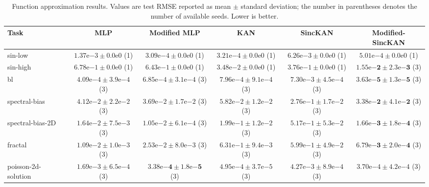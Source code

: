 \documentclass[preprint,12pt]{elsarticle}
\begin{document}
\begin{table}[t]
\centering
\caption{Function approximation results. Values are test RMSE reported as mean \(\pm\) standard deviation; the number in parentheses denotes the number of available seeds. Lower is better.}
\label{tab:function_approx}
\scriptsize
\setlength{\tabcolsep}{2pt}
\renewcommand{\arraystretch}{1.05}
\begin{tabular*}{\textwidth}{@{\extracolsep{\fill}}lccccc@{}}
\toprule
Task & MLP & Modified MLP & KAN & SincKAN & Modified-SincKAN \\
\midrule
sin-low & \(1.37\mathrm{e}{-3}\pm0.0\mathrm{e}{0}\) (1) & \(3.09\mathrm{e}{-4}\pm0.0\mathrm{e}{0}\) (1) & \(3.21\mathrm{e}{-4}\pm0.0\mathrm{e}{0}\) (1) & \(6.26\mathrm{e}{-3}\pm0.0\mathrm{e}{0}\) (1) & \(5.01\mathrm{e}{-4}\pm0.0\mathrm{e}{0}\) (1) \\
sin-high & \(6.78\mathrm{e}{-1}\pm0.0\mathrm{e}{0}\) (1) & \(6.43\mathrm{e}{-1}\pm0.0\mathrm{e}{0}\) (1) & \(3.48\mathrm{e}{-2}\pm0.0\mathrm{e}{0}\) (1) & \(3.76\mathrm{e}{-1}\pm0.0\mathrm{e}{0}\) (1) & \(\mathbf{1.55\mathrm{e}{-2}\pm2.3\mathrm{e}{-3}}\) (3) \\
bl & \(4.09\mathrm{e}{-4}\pm3.9\mathrm{e}{-4}\) (3) & \(6.85\mathrm{e}{-4}\pm3.1\mathrm{e}{-4}\) (3) & \(7.96\mathrm{e}{-4}\pm9.1\mathrm{e}{-4}\) (3) & \(7.30\mathrm{e}{-3}\pm4.5\mathrm{e}{-4}\) (3) & \(\mathbf{3.63\mathrm{e}{-5}\pm1.3\mathrm{e}{-5}}\) (3) \\
spectral-bias & \(4.12\mathrm{e}{-2}\pm2.2\mathrm{e}{-2}\) (3) & \(3.69\mathrm{e}{-2}\pm1.7\mathrm{e}{-2}\) (3) & \(5.82\mathrm{e}{-2}\pm1.2\mathrm{e}{-2}\) (3) & \(2.76\mathrm{e}{-1}\pm1.7\mathrm{e}{-2}\) (3) & \(\mathbf{3.38\mathrm{e}{-2}\pm4.1\mathrm{e}{-2}}\) (3) \\
spectral-bias-2D & \(1.64\mathrm{e}{-2}\pm7.5\mathrm{e}{-3}\) (3) & \(1.05\mathrm{e}{-2}\pm6.1\mathrm{e}{-4}\) (3) & \(1.99\mathrm{e}{-1}\pm1.2\mathrm{e}{-2}\) (3) & \(5.17\mathrm{e}{-1}\pm5.3\mathrm{e}{-2}\) (3) & \(\mathbf{1.66\mathrm{e}{-3}\pm1.8\mathrm{e}{-4}}\) (3) \\
fractal & \(1.09\mathrm{e}{-2}\pm1.0\mathrm{e}{-3}\) (3) & \(2.53\mathrm{e}{-2}\pm8.0\mathrm{e}{-3}\) (3) & \(6.31\mathrm{e}{-1}\pm9.4\mathrm{e}{-3}\) (3) & \(5.99\mathrm{e}{-1}\pm4.9\mathrm{e}{-2}\) (3) & \(\mathbf{6.79\mathrm{e}{-3}\pm2.0\mathrm{e}{-4}}\) (3) \\
poisson-2d-solution & \(1.69\mathrm{e}{-3}\pm6.5\mathrm{e}{-4}\) (3) & \(\mathbf{3.38\mathrm{e}{-4}\pm1.8\mathrm{e}{-5}}\) (3) & \(4.95\mathrm{e}{-4}\pm3.7\mathrm{e}{-5}\) (3) & \(4.27\mathrm{e}{-3}\pm8.9\mathrm{e}{-4}\) (3) & \(3.70\mathrm{e}{-4}\pm4.2\mathrm{e}{-4}\) (3) \\
\bottomrule
\end{tabular*}
\end{table}
\end{document}

